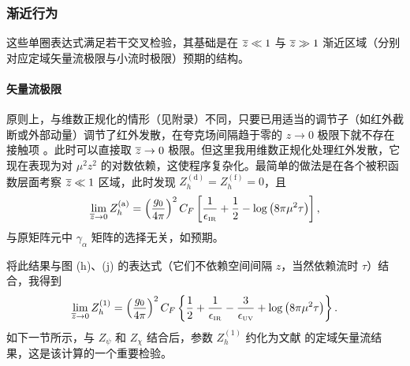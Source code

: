 \subsubsection{渐近行为}
这些单圈表达式满足若干交叉检验，其基础是在 $\overline{z} \ll1 $ 与 $\overline{z} \gg 1$ 渐近区域（分别对应定域矢量流极限与小流时极限）预期的结构。

\paragraph{矢量流极限}原则上，与维数正规化的情形（见附录）不同，只要已用适当的调节子（如红外截断或外部动量）调节了红外发散，在夸克场间隔趋于零的 $z\to 0$ 极限下就不存在接触项 \cite{Constantinou:2017sej}。此时可以直接取 $\overline{z}\to 0$ 极限。但这里我用维数正规化处理红外发散，它现在表现为对 $\mu^2z^2$ 的对数依赖，这使程序复杂化。最简单的做法是在各个被积函数层面考察 $\overline{z}\ll 1$ 区域，此时发现 $Z_h^\mathrm{(d)}=Z_h^\mathrm{(f)}=0$，且
\begin{equation}
\lim_{\overline{z} \to 0}Z_h^\mathrm{(a)} =  \left(\frac{g_0}{4\pi}\right)^2C_F \left[\frac{1}{\epsilon_{\scriptscriptstyle\mathrm{IR}}}+\frac{1}{2} - \log\left(8\pi\mu^2\tau\right)\right],
\end{equation}
与原矩阵元中 $\gamma_\alpha$ 矩阵的选择无关，如预期。

将此结果与图 (h)、(j) 的表达式（它们不依赖空间间隔 $z$，当然依赖流时 $\tau$）结合，我得到
\begin{equation}
\lim_{\overline{z} \to 0}Z_h^{(1)} = \left(\frac{g_0}{4\pi}\right)^2C_F \left\{\frac{1}{2}+\frac{1}{\epsilon_{\scriptscriptstyle\mathrm{IR}}}-\frac{3}{\epsilon_{\scriptscriptstyle\mathrm{UV}}} + \log\left(8\pi\mu^2\tau\right)\right\}.\label{eq:hoztozero}
\end{equation}
如下一节所示，与 $Z_\psi$ 和 $Z_\chi$ 结合后，参数 $Z_h^{(1)}$ 约化为文献 \cite{Hieda:2016lly} 的定域矢量流结果，这是该计算的一个重要检验。

